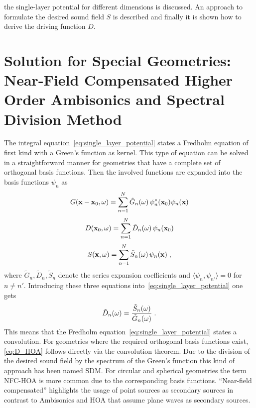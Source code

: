  the single-layer potential for different
dimensions is discussed. An approach
to formulate the desired sound field $S$ is described and finally it is
shown how to derive the driving function $D$.



\section[Near-Field Compensated Higher Order Ambisonics]{Solution for Special
Geometries: Near-Field Compensated Higher Order Ambisonics and Spectral Division Method}
\label{sec:HOA_SDM}

The integral equation~\eqref{eq:single_layer_potential} states a Fredholm
equation of first kind with a Green's function as kernel. This type of equation
can be solved in a straightforward manner for geometries that have a complete
set of orthogonal basis functions. Then the involved functions are expanded
into the basis functions $\psi_n$ as\autocite[Compare][p.\,940]{Morse1981}
%
\begin{equation}
    G(\x-\x_0,\omega) = \sum_{n=1}^N \tilde{G}_n(\omega) \,
        \psi_n^*(\x_0) \psi_n(\x)
    \label{eq:G_expansion}
\end{equation}
%
\begin{equation}
    D(\x_0,\omega) = \sum_{n=1}^N \tilde{D}_n(\omega) \,
        \psi_n(\x_0)
    \label{eq:D_expansion}
\end{equation}
%
\begin{equation}
    S(\x,\omega) = \sum_{n=1}^N \tilde{S}_n(\omega) \,
        \psi_n(\x) \qc
    \label{eq:S_expansion}
\end{equation}
%
where $\tilde{G}_n, \tilde{D}_n, \tilde{S}_n$ denote the series expansion
coefficients and \linebreak $\langle\psi_n, \psi_{n'}\rangle = 0$ for $n \ne n'$.
Introducing these three equations
into~\eqref{eq:single_layer_potential} one gets
%
\begin{equation}
    \tilde{D}_n(\omega) = \frac{\tilde{S}_n(\omega)}{\tilde{G}_n(\omega)} \qp
    \label{eq:D_HOA}
\end{equation}
%
This means that the Fredholm equation~\eqref{eq:single_layer_potential}
states a convolution. For geometries where
the required orthogonal basis functions exist, \eqref{eq:D_HOA} follows directly via
the convolution theorem.\autocite[Compare][p.\,1013]{Arfken2005}
Due to the division of the desired sound field by the spectrum of the
Green's function this kind
of approach has been named \acf{SDM}.
For circular and spherical geometries the term \acf{NFC-HOA} is more common due
to the corresponding basis functions. ``Near-field compensated'' highlights the
usage of point sources as secondary sources in contrast to Ambisonics and
\acf{HOA} that assume plane waves as secondary sources.

